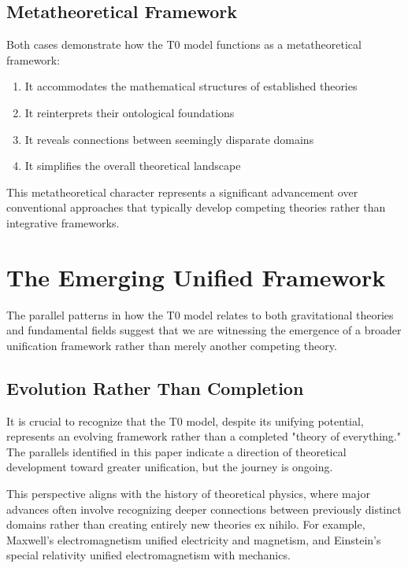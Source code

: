 \documentclass[12pt,a4paper]{article}
\begin{document}
	\subsection{Metatheoretical Framework}
	\label{subsec:metatheory}
	
	Both cases demonstrate how the T0 model functions as a metatheoretical framework:
	
	\begin{enumerate}
		\item It accommodates the mathematical structures of established theories
		\item It reinterprets their ontological foundations
		\item It reveals connections between seemingly disparate domains
		\item It simplifies the overall theoretical landscape
	\end{enumerate}
	
	This metatheoretical character represents a significant advancement over conventional approaches that typically develop competing theories rather than integrative frameworks.
	
	\section{The Emerging Unified Framework}
	\label{sec:emerging_framework}
	
	The parallel patterns in how the T0 model relates to both gravitational theories and fundamental fields suggest that we are witnessing the emergence of a broader unification framework rather than merely another competing theory.
	
	\subsection{Evolution Rather Than Completion}
	\label{subsec:evolution}
	
	It is crucial to recognize that the T0 model, despite its unifying potential, represents an evolving framework rather than a completed "theory of everything." The parallels identified in this paper indicate a direction of theoretical development toward greater unification, but the journey is ongoing.
	
	This perspective aligns with the history of theoretical physics, where major advances often involve recognizing deeper connections between previously distinct domains rather than creating entirely new theories ex nihilo. For example, Maxwell's electromagnetism unified electricity and magnetism, and Einstein's special relativity unified electromagnetism with mechanics.
	
\end{document}
